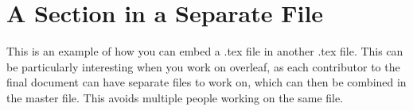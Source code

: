 \section{A Section in a Separate File}

This is an example of how you can embed a .tex file in another
.tex file. This can be particularly interesting when you work on
overleaf, as each contributor to the final document can have separate
files to work on, which can then be combined in the master file.
This avoids multiple people working on the same file.
